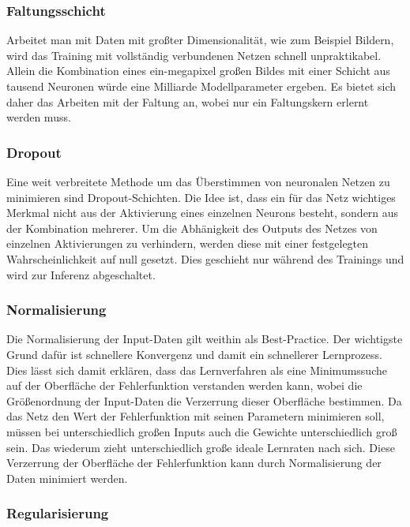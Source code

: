 \subsubsection{Faltungsschicht}

Arbeitet man mit Daten mit großter Dimensionalität, wie zum Beispiel Bildern, wird das Training mit vollständig verbundenen Netzen schnell unpraktikabel. Allein die Kombination eines ein-megapixel großen Bildes mit einer Schicht aus tausend Neuronen würde eine Milliarde Modellparameter ergeben.
Es bietet sich daher das Arbeiten mit der Faltung an, wobei nur ein Faltungskern erlernt werden muss.

\subsubsection{Dropout}

Eine weit verbreitete Methode um das Überstimmen von neuronalen Netzen zu minimieren sind Dropout-Schichten. Die Idee ist, dass ein für das Netz wichtiges Merkmal nicht aus der Aktivierung eines einzelnen Neurons besteht, sondern aus der Kombination mehrerer.
Um die Abhänigkeit des Outputs des Netzes von einzelnen Aktivierungen zu verhindern, werden diese mit einer festgelegten Wahrscheinlichkeit auf null gesetzt. Dies geschieht nur während des Trainings und wird zur Inferenz abgeschaltet.

\subsubsection{Normalisierung}

Die Normalisierung der Input-Daten gilt weithin als Best-Practice. Der wichtigste Grund dafür ist schnellere Konvergenz und damit ein schnellerer Lernprozess.
Dies lässt sich damit erklären, dass das Lernverfahren als eine Minimumssuche auf der Oberfläche der Fehlerfunktion verstanden werden kann, wobei die Größenordnung der Input-Daten die Verzerrung dieser Oberfläche bestimmen. Da das Netz den Wert der Fehlerfunktion mit seinen Parametern minimieren soll, müssen bei unterschiedlich großen Inputs auch die Gewichte unterschiedlich groß sein. Das wiederum zieht unterschiedlich große ideale Lernraten nach sich. Diese Verzerrung der Oberfläche der Fehlerfunktion kann durch Normalisierung der Daten minimiert werden.

\subsubsection{Regularisierung}

